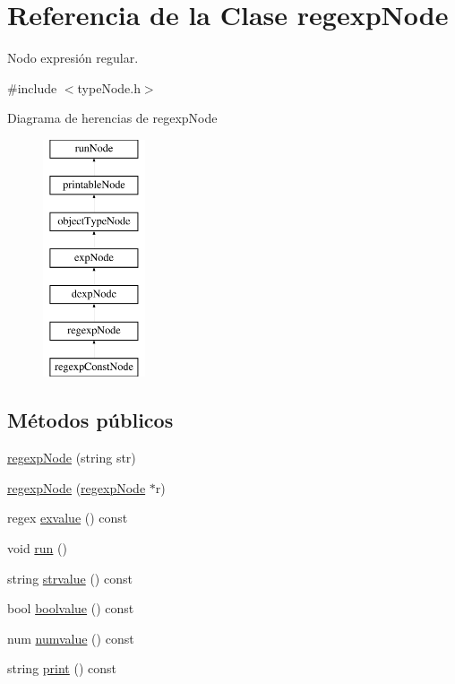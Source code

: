 \hypertarget{classregexpNode}{\section{Referencia de la Clase regexp\-Node}
\label{classregexpNode}
}


Nodo expresión regular.  




{\ttfamily \#include $<$type\-Node.\-h$>$}

Diagrama de herencias de regexp\-Node\begin{figure}[H]
\begin{center}
\leavevmode
\includegraphics[height=7.000000cm]{classregexpNode}
\end{center}
\end{figure}
\subsection*{Métodos públicos}
\begin{DoxyCompactItemize}
\item 
\hyperlink{classregexpNode_ab9eef6b08a9f1618fb54f2f2f7ba4e11}{regexp\-Node} (string str)
\item 
\hyperlink{classregexpNode_a4a2d233754aa24d0d4083063f274cd4b}{regexp\-Node} (\hyperlink{classregexpNode}{regexp\-Node} $\ast$r)
\item 
regex \hyperlink{classregexpNode_a9a461a78de0c0a5932b85b2f1a5759fc}{exvalue} () const 
\item 
void \hyperlink{classregexpNode_a6371f51d04fc8c86e6b2ef536b275007}{run} ()
\item 
string \hyperlink{classregexpNode_a223644545a3ec0258c6083fa8686a3cb}{strvalue} () const 
\item 
bool \hyperlink{classregexpNode_a10a587695cb42fa6f9d867e05e26068f}{boolvalue} () const 
\item 
num \hyperlink{classregexpNode_a6d6e4d51eaedec3def49747e4da3b03b}{numvalue} () const 
\item 
string \hyperlink{classregexpNode_a59887890d91ffedd957b47794025f133}{print} () const 
\end{DoxyCompactItemize}
